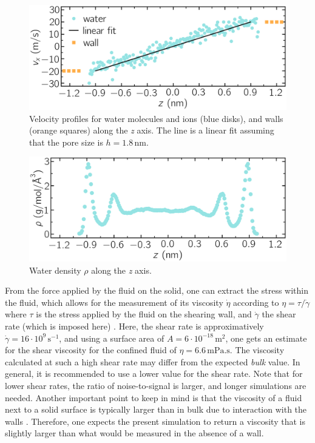 \documentclass[9pt,tutorial]{livecoms}
\begin{document}
\begin{figure}
\centering
\includegraphics[width=\linewidth]{NANOSHEAR-velocity}
\caption{Velocity profiles for water molecules and ions (blue disks), and walls (orange squares) along the \textit{z} axis. The line is a linear fit assuming that the pore size is $h = 1.8\,\text{nm}$.}
\label{fig:NANOSHEAR-velocity}
\end{figure}

\begin{figure}
\centering
\includegraphics[width=\linewidth]{NANOSHEAR-density}
\caption{Water density $\rho$ along the \textit{z} axis.}
\label{fig:NANOSHEAR-density}
\end{figure}

From the force applied by the fluid on the solid, one can extract the stress within the fluid, which allows for the measurement of its viscosity $\dot{\eta}$ according to $\eta = \tau / \dot{\gamma}$ where $\tau$ is the stress applied by the fluid on the shearing wall, and $\dot{\gamma}$ the shear rate (which is imposed here) \cite{gravelle2021violations}. Here, the shear rate is approximatively $\dot{\gamma} = 16 \cdot 10^9\,\text{s}^{-1}$, and using a surface area of $A = 6 \cdot 10^{-18}\,\text{m}^2$, one gets an estimate for the shear viscosity for the confined fluid of $\eta = 6.6\,\text{mPa.s}$. The viscosity calculated at such a high shear rate may differ from the expected \textit{bulk} value. In general, it is recommended to use a lower value for the shear rate. Note that for lower shear rates, the ratio of noise-to-signal is larger, and longer simulations are needed. Another important point to keep in mind is that the viscosity of a fluid next to a solid surface is typically larger than in bulk due to interaction with the walls \cite{wolde-kidanInterplayInterfacialViscosity2021}. Therefore, one expects the present simulation to return a viscosity that is slightly larger than what would be measured in the absence of a wall.
\end{document}
